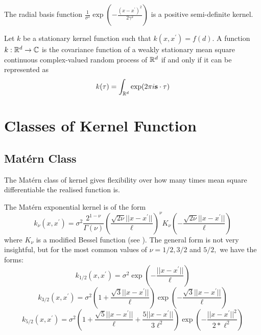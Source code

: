 \color{red}

\begin{theorem}\label{thm:rbf_pos_def}
    The radial basis function
    $\frac{1}{\sigma^2}\exp(-\frac{(x - x^\prime)^2}{2\gamma^2})$ is a positive
    semi-definite kernel.
\end{theorem}

\begin{theorem}
    Let $k$ be a stationary kernel function such that
    $k(x, x^\prime) = f(d)$. A function $k:\mathbb{R}^d\to\mathbb{C}$ is the covariance
    function of a weakly
    stationary mean square continuous complex-valued random process of $\mathbb{R}^d$
    if and only if it can be represented as
    $$k(\mathbf{\tau}) = \int_{\mathbb{R}^d} \exp(2\pi i \mathbf{s}\cdot\mathbf{\tau})$$
\end{theorem}

\parencite[82]{rasmussen_gaussian_2008}

\color{black}

\section{Classes of Kernel Function}

\subsection*{Mat\'{e}rn Class}

\begin{figure}
\end{figure}

The Mat\'ern class of kernel gives flexibility over how many times mean square
differentiable the realised function is.

The Mat\'ern exponential kernel is of the form
$$k_\nu(x, x^\prime)
    = \sigma^2\frac{2^{1 - \nu}}{\Gamma(\nu)}
    \left(\frac{\sqrt{2\nu}||x - x^\prime||}{\ell}\right)^\nu
    K_\nu\left(-\frac{\sqrt{2\nu}||x - x^\prime||}{\ell}\right)$$
where $K_\nu$ is a modified Bessel function
(see \cite[374]{abramowitz_handbook_2013}). The general form is not very
insightful, but for the most common values of $\nu = 1/2, 3/2$ and $5/2,$ we
have the forms:
$$k_{1/2}(x, x^\prime)
    = \sigma^2\exp\left(-\frac{||x - x^\prime||}{\ell}\right)$$
$$k_{3/2}(x, x^\prime)
    = \sigma^2
    \left(1 + \frac{\sqrt{3}||x - x^\prime||}{\ell}\right)
    \exp\left(-\frac{\sqrt{3}||x - x^\prime||}{\ell}\right)$$
$$k_{5/2}(x, x^\prime)
    = \sigma^2
    \left(
    1 + \frac{\sqrt{5}||x - x^\prime||}{\ell} + \frac{5||x - x^\prime||}{3\ell^2}
    \right)
    \exp\left(-\frac{||x - x^\prime||^2}{2*\ell^2}\right)$$

